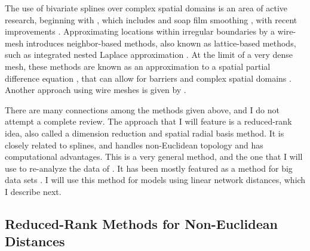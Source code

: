 \documentclass[11pt, titlepage]{article}\usepackage[]{graphicx}\usepackage[]{color}
\begin{document}
\begin{spacing}{1.9}
\begin{flushleft}
The use of bivariate splines over complex spatial domains is an area of active research, beginning with \citet{Rams:spli:2002}, which includes \citet{Wang:Rana:low:2007} and soap film smoothing \citep{Wood:Brav:Hedl:soap:2008}, with recent improvements \citep{Sang:Rams:Rams:spat:2013, Mill:Wood:fini:2014}. Approximating locations within irregular boundaries by a wire-mesh introduces neighbor-based methods, also known as lattice-based methods, such as integrated nested Laplace approximation \citep[INLA,][]{Rue:Mart:Chop:appr:2009}.  At the limit of a very dense mesh, these methods are known as an approximation to a spatial partial difference equation \citep[SPDE,][]{Lind:Rue:Lind:expl:2011}, that can allow for barriers and complex spatial domains \citep{Bakk:Vanh:Illi:Simp:acco:2016}.  Another approach using wire meshes is given by \citet{McIn:Barr:latt:2017}. 

There are many connections among the methods given above, and I do not attempt a complete review. The approach that I will feature is a reduced-rank idea, also called a dimension reduction \citep{Wikl:Cres:dime:1999} and spatial radial basis \citep{Lin:Chen:spat:2004, Hefl:Brom:Bros:Bude:basi:2016} method. It is closely related to splines, and handles non-Euclidean topology and has computational advantages.  This is a very general method, and the one that I will use to re-analyze the data of \citet{Ladl:Avga:Whea:Boyc:pred:2016}.  It has been mostly featured as a method for big data sets \citep[e.g.][]{Wikl:Cres:dime:1999, Rupp:Wand:Carr:semi:2003, Cres:Gard:fixe:2008,Bane:Gelf:Finl:Sang:gaus:2008}.  I will use this method for models using linear network distances, which I describe next.


\subsection*{Reduced-Rank Methods for Non-Euclidean Distances}


\end{flushleft}
\end{spacing}
\end{document}
